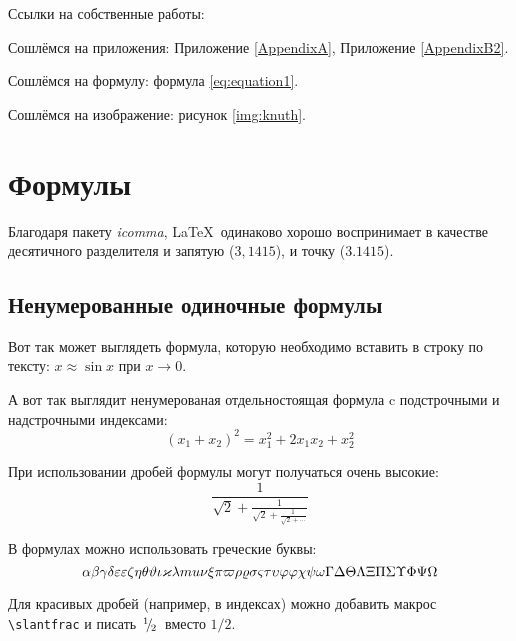 
Ссылки на собственные работы:~\cite{vakbib1, confbib1}

Сошлёмся на приложения: Приложение \ref{AppendixA}, Приложение \ref{AppendixB2}.

Сошлёмся на формулу: формула \eqref{eq:equation1}.

Сошлёмся на изображение: рисунок \ref{img:knuth}.


\section{Формулы} \label{sect1_3}

Благодаря пакету \textit{icomma}, \LaTeX~одинаково хорошо воспринимает в качестве десятичного разделителя и запятую ($3,1415$), и точку ($3.1415$).

\subsection{Ненумерованные одиночные формулы} \label{subsect1_3_1}

Вот так может выглядеть формула, которую необходимо вставить в строку по тексту: $x \approx \sin x$ при $x \to 0$.

А вот так выглядит ненумерованая отдельностоящая формула c подстрочными и надстрочными индексами:
\[
(x_1+x_2)^2 = x_1^2 + 2 x_1 x_2 + x_2^2
\]

При использовании дробей формулы могут получаться очень высокие:
\[
  \frac{1}{\sqrt{2}+
  \displaystyle\frac{1}{\sqrt{2}+
  \displaystyle\frac{1}{\sqrt{2}+\cdots}}}
\]

В формулах можно использовать греческие буквы:
\[
\alpha\beta\gamma\delta\epsilon\varepsilon\zeta\eta\theta\vartheta\iota\kappa\lambda\\mu\nu\xi\pi\varpi\rho\varrho\sigma\varsigma\tau\upsilon\phi\varphi\chi\psi\omega\Gamma\Delta\Theta\Lambda\Xi\Pi\Sigma\Upsilon\Phi\Psi\Omega
\]

Для красивых дробей (например, в индексах) можно добавить макрос
\verb+\slantfrac+ и писать $\slantfrac{1}{2}$ вместо $1/2$.


